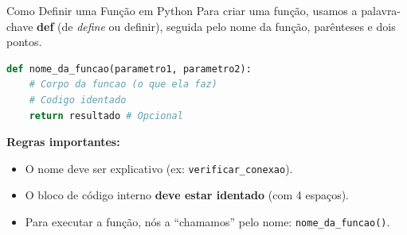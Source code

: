 \begin{frame}[fragile]{Como Definir uma Função em Python}
    Para criar uma função, usamos a palavra-chave \textbf{def} (de \textit{define} ou definir), seguida pelo nome da função, parênteses e dois pontos.
    
    \begin{lstlisting}[language=Python]
def nome_da_funcao(parametro1, parametro2):
    # Corpo da funcao (o que ela faz)
    # Codigo identado
    return resultado # Opcional
    \end{lstlisting}
    
    \vspace{0.3cm}
    \textbf{Regras importantes:}
    \begin{itemize}
        \item O nome deve ser explicativo (ex: \texttt{verificar\_conexao}).
        \item O bloco de código interno \textbf{deve estar identado} (com 4 espaços).
        \item Para executar a função, nós a ``chamamos'' pelo nome: \texttt{nome\_da\_funcao()}.
    \end{itemize}
\end{frame}
